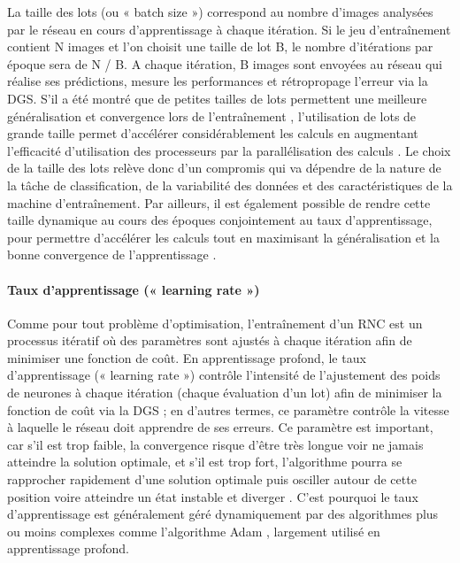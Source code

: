 La taille des lots (ou « batch size ») correspond au nombre d’images analysées par le réseau en cours d’apprentissage à chaque itération. Si le jeu d’entraînement contient N images et l’on choisit une taille de lot B, le nombre d’itérations par époque sera de N / B. A chaque itération, B images sont envoyées au réseau qui réalise ses prédictions, mesure les performances et rétropropage l’erreur via la DGS. S’il a été montré que de petites tailles de lots permettent une meilleure généralisation et convergence lors de l’entraînement \citep{wilson_general_2003, keskar_large-batch_2017}, l’utilisation de lots de grande taille permet d’accélérer considérablement les calculs en augmentant l’efficacité d’utilisation des processeurs par la parallélisation des calculs \citep{das_distributed_2016}. Le choix de la taille des lots relève donc d’un compromis qui va dépendre de la nature de la tâche de classification, de la variabilité des données et des caractéristiques de la machine d’entraînement. Par ailleurs, il est également possible de rendre cette taille dynamique au cours des époques conjointement au taux d’apprentissage, pour permettre d’accélérer les calculs tout en maximisant la généralisation et la bonne convergence de l’apprentissage \citep{balles_coupling_2017}.

\paragraph{Taux d’apprentissage (« learning rate »)}

Comme pour tout problème d’optimisation, l’entraînement d’un RNC est un processus itératif où des paramètres sont ajustés à chaque itération afin de minimiser une fonction de coût. En apprentissage profond, le taux d’apprentissage (« learning rate ») contrôle l’intensité de l’ajustement des poids de neurones à chaque itération (chaque évaluation d’un lot) afin de minimiser la fonction de coût via la DGS ; en d’autres termes, ce paramètre contrôle la vitesse à laquelle le réseau doit apprendre de ses erreurs. Ce paramètre est important, car s’il est trop faible, la convergence risque d’être très longue voir ne jamais atteindre la solution optimale, et s’il est trop fort, l’algorithme pourra se rapprocher rapidement d’une solution optimale puis osciller autour de cette position voire atteindre un état instable et diverger \citep{aggarwal_neural_2018}. C’est pourquoi le taux d’apprentissage est généralement géré dynamiquement par des algorithmes plus ou moins complexes comme l’algorithme Adam \citep{kingma_adam:_2014}, largement utilisé en apprentissage profond.

